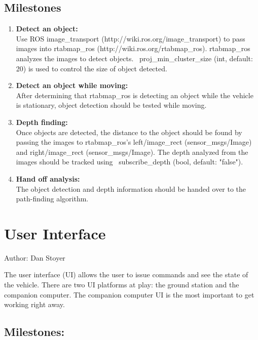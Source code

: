 \documentclass[compsoc,draftclsnofoot,onecolumn,10pt]{IEEEtran}
\begin{document}
\subsection{Milestones}
\begin{enumerate}
	
	\item \textbf{Detect an object:}\\
	Use ROS image\_transport (http://wiki.ros.org/image\_transport) to pass images
	into rtabmap\_ros (http://wiki.ros.org/rtabmap\_ros). rtabmap\_ros analyzes
	the images to detect objects. ~proj\_min\_cluster\_size (int, default: 20) is
	used to control the size of object detected.
	
	\item \textbf{Detect an object while moving:}\\
	After determining that rtabmap\_ros is detecting an object while the vehicle is
	stationary, object detection should be tested while moving.
	
	\item \textbf{Depth finding:}\\
	Once objects are detected, the distance to the object should be found by
	passing the images to rtabmap\_ros's left/image\_rect (sensor\_msgs/Image) and
	right/image\_rect (sensor\_msgs/Image). The depth analyzed from the images
	should be tracked using ~subscribe\_depth (bool, default: "false").
	
	\item \textbf{Hand off analysis:}\\
	The object detection and depth information should be handed over to the
	path-finding algorithm.
	
\end{enumerate}

\section{User Interface}
Author: Dan Stoyer\par
The user interface (UI) allows the user to issue commands and see the state of
the vehicle. There are two UI platforms at play: the ground station and the companion computer.
The companion computer UI is the most important to get working right away.

\subsection{Milestones:}
\end{document}
